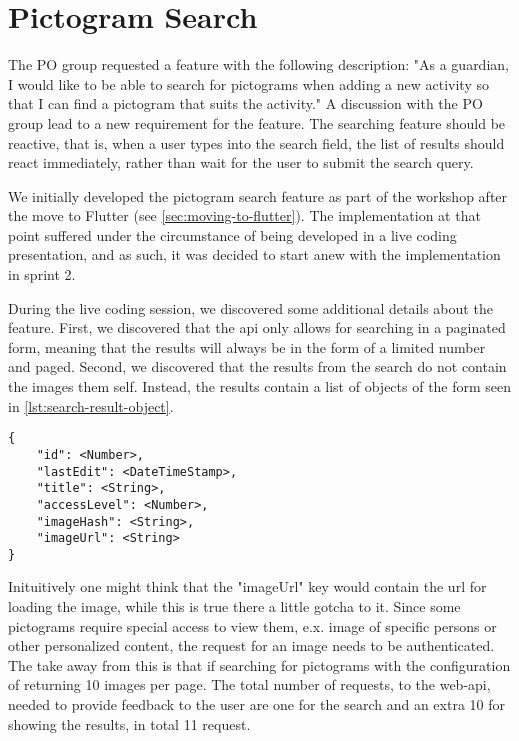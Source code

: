 \section{Pictogram Search}
The \gls{PO} group requested a feature with the following description: "As a guardian, I would like to be able to search for pictograms when adding a new activity so that I can find a pictogram that suits the activity." A discussion with the \gls{PO} group lead to a new requirement for the feature. The searching feature should be reactive, that is, when a user types into the search field, the list of results should react immediately, rather than wait for the user to submit the search query.

We initially developed the pictogram search feature as part of the workshop after the move to Flutter (see \autoref{sec:moving-to-flutter}). The implementation at that point suffered under the circumstance of being developed in a live coding presentation, and as such, it was decided to start anew with the implementation in sprint 2.

During the live coding session, we discovered some additional details about the feature. First, we discovered that the \gls{api} only allows for searching in a paginated form, meaning that the results will always be in the form of a limited number and paged. Second, we discovered that the results from the search do not contain the images them self. Instead, the results contain a list of objects of the form seen in \autoref{lst:search-result-object}.

\begin{lstlisting}[label={lst:search-result-object},caption={Search result object}]
{
    "id": <Number>,
    "lastEdit": <DateTimeStamp>,
    "title": <String>,
    "accessLevel": <Number>,
    "imageHash": <String>,
    "imageUrl": <String>
}
\end{lstlisting}

Inituitively one might think that the "imageUrl" key would contain the url for loading the image, while this is true there a little gotcha to it. Since some pictograms require special access to view them, e.x. image of specific persons or other personalized content, the request for an image needs to be authenticated. The take away from this is that if searching for pictograms with the configuration of returning 10 images per page. The total number of requests, to the web-api, needed to provide feedback to the user are one for the search and an extra 10 for showing the results, in total 11 request.

